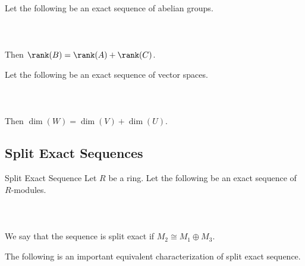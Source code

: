 \documentclass[a4paper]{article}
\begin{document}
\begin{lmm}{}{} Let the following be an exact sequence of abelian groups. \\~\\
\\~\\
Then $\rank(B)=\rank(A)+\rank(C)$. 
\end{lmm}

\begin{lmm}{}{} Let the following be an exact sequence of vector spaces. \\~\\
\\~\\
Then $\dim(W)=\dim(V)+\dim(U)$. 
\end{lmm}

\subsection{Split Exact Sequences}
\begin{defn}{Split Exact Sequence}{} Let $R$ be a ring. Let the following be an exact sequence of $R$-modules. \\~\\
\\~\\
We say that the sequence is split exact if $M_2\cong M_1\oplus M_3$. 
\end{defn}

The following is an important equivalent characterization of split exact sequence. 
\end{document}
